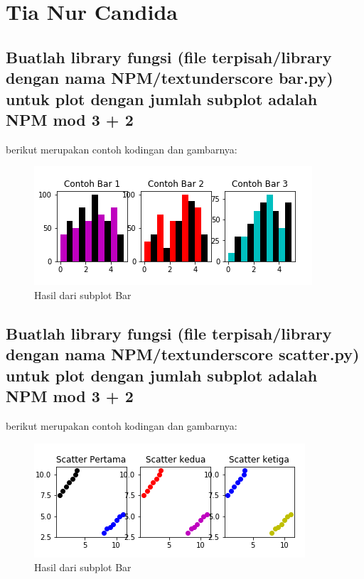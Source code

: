 \section{Tia Nur Candida}
\subsection{Buatlah library fungsi (file terpisah/library dengan nama NPM/textunderscore bar.py) untuk plot dengan jumlah subplot adalah NPM mod 3 + 2}
berikut merupakan contoh kodingan dan gambarnya:


\begin{figure}[h]
\centering
\includegraphics[scale=0.9]{figures/6/1174086/bar.png}
\caption{Hasil dari subplot Bar}
\label{fig:contoh}
\end{figure}
\subsection{Buatlah library fungsi (file terpisah/library dengan nama NPM/textunderscore scatter.py) untuk plot dengan jumlah subplot adalah NPM mod 3 + 2}
berikut merupakan contoh kodingan dan gambarnya:


\begin{figure}[h]
\centering
\includegraphics[scale=0.9]{figures/6/1174086/scatter.png}
\caption{Hasil dari subplot Bar}
\label{fig:contoh}
\end{figure}
